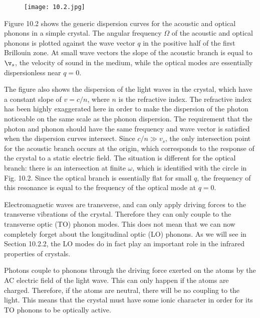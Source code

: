 \documentclass[12pt]{book}
\begin{document}
{\begin{figure}
  \centering
  \texttt{[image: 10.2.jpg]}\label{fig:10.2}\\
\end{figure}

Figure 10.2 shows the generic dispersion curves for the acoustic and optical phonons in a simple crystal. The angular frequency $\Omega$ of the acoustic and optical phonons is plotted against the wave vector $q$ in the positive half of the first Brillouin zone. At small wave vectors the slope of the acoustic branch is equal to $\v_s$, the velocity of sound in the medium, while the optical modes are essentially dispersionless near $q = 0$.

The figure also shows the dispersion of the light waves in the crystal, which have a constant slope of $v = c / n$, where $n$ is the refractive index. The refractive index has been highly exaggerated here in order to make the dispersion of the photon noticeable on the same scale as the phonon dispersion. The requirement that the photon and phonon should have the same frequency and wave vector is satisfied when the dispersion curves intersect. Since $c/n\gg v_s$, the only intersection point for the acoustic branch occurs at the origin, which corresponds to the response of the crystal to a static electric field. The situation is different for the optical branch: there is an intersection at finite $\omega$, which is identified with the circle in Fig. 10.2. Since the optical branch is essentially flat for small $q$, the frequency of this resonance is equal to the frequency of the optical mode at $q = 0$.

Electromagnetic waves are transverse, and can only apply driving forces to the transverse vibrations of the crystal. Therefore they can only couple to the transverse optic (TO) phonon modes. This does not mean that we can now completely forget about the longitudinal optic (LO) phonons. As we will see in Section 10.2.2, the LO modes do in fact play an important role in the infrared properties of crystals.

Photons couple to phonons through the driving force exerted on the atoms by the AC electric field of the light wave. This can only happen if the atoms are charged. Therefore, if the atoms are neutral, there will be no coupling to the light. This means that the crystal must have some ionic character in order for its TO phonons to be optically active.

}
\end{document}
